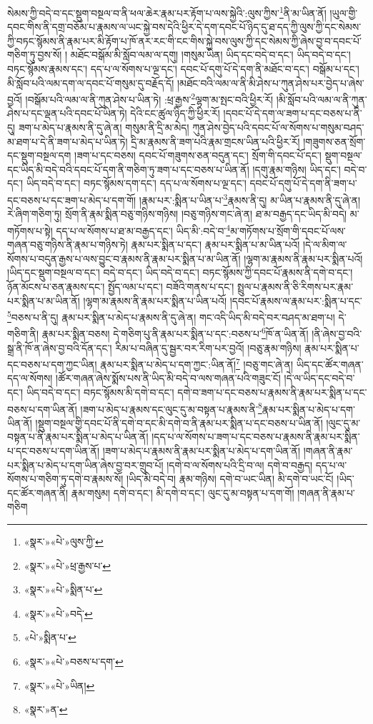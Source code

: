 སེམས་ཀྱི་བདེ་བ་དང་སྡུག་བསྔལ་བ་ནི་ཕལ་ཆེར་རྣམ་པར་རྟོག་པ་ལས་སྐྱེའི་:ལུས་ཀྱིས་\footnote{«སྣར་»«པེ་»ལུས་ཀྱི་}ནི་མ་ཡིན་ནོ། །ཡུལ་གྱི་དབང་གིས་ནི་དགྲ་བཅོམ་པ་རྣམས་ལ་ཡང་སྐྱེ་བས་དེའི་ཕྱིར་དེ་དག་དབང་པོ་ཉིད་དུ་ཐ་དད་ཀྱི་ལུས་ཀྱི་དང་སེམས་ཀྱི་བཏང་སྙོམས་ནི་རྣམ་པར་མི་རྟོག་པ་ཁོ་ནར་རང་གི་ངང་གིས་སྐྱེ་བས་ལུས་ཀྱི་དང་སེམས་ཀྱི་ཞེས་བྱ་བ་དབང་པོ་གཅིག་ཏུ་བྱས་སོ། །
མཐོང་བསྒོམ་མི་སློབ་ལམ་ལ་དགུ། །གསུམ་ཡིན། ཡིད་དང་བདེ་བ་དང་། ཡིད་བདེ་བ་དང་། བཏང་སྙོམས་རྣམས་དང་། དད་པ་ལ་སོགས་པ་ལྔ་དང་། དབང་པོ་དགུ་པོ་དེ་དག་ནི་མཐོང་བ་དང་། བསྒོམ་པ་དང་། མི་སློབ་པའི་ལམ་དག་ལ་དབང་པོ་གསུམ་དུ་བརྗོད་དོ། །མཐོང་བའི་ལམ་ལ་ནི་མི་ཤེས་པ་ཀུན་ཤེས་པར་བྱེད་པ་ཞེས་བྱའོ། །བསྒོམ་པའི་ལམ་ལ་ནི་ཀུན་ཤེས་པ་ཡིན་ཏེ། :ཕྲ་རྒྱས་\footnote{«སྣར་»«པེ་»ཕྲ་རྒྱས་པ་}ལྷག་མ་སྤང་བའི་ཕྱིར་རོ། །མི་སློབ་པའི་ལམ་ལ་ནི་ཀུན་ཤེས་པ་དང་ལྡན་པའི་དབང་པོ་ཡིན་ཏེ། དེའི་ངང་ཚུལ་ཉིད་ཀྱི་ཕྱིར་རོ། །དབང་པོ་དེ་དག་ལ་ཟག་པ་དང་བཅས་པ་ནི་དུ། ཟག་པ་མེད་པ་རྣམས་ནི་དུ་ཞེ་ན། གསུམ་ནི་དྲི་མ་མེད། ཀུན་ཤེས་བྱེད་པའི་དབང་པོ་ལ་སོགས་པ་གསུམ་བཤད་མ་ཐག་པ་དེ་ནི་ཟག་པ་མེད་པ་ཡིན་ཏེ། དྲི་མ་རྣམས་ནི་ཟག་པའི་རྣམ་གྲངས་ཡིན་པའི་ཕྱིར་རོ། །གཟུགས་ཅན་སྲོག་དང་སྡུག་བསྔལ་དག །ཟག་པ་དང་བཅས། དབང་པོ་གཟུགས་ཅན་བདུན་དང་། སྲོག་གི་དབང་པོ་དང་། སྡུག་བསྔལ་དང་ཡིད་མི་བདེ་བའི་དབང་པོ་དག་ནི་གཅིག་ཏུ་ཟག་པ་དང་བཅས་པ་ཡིན་ནོ། །དགུ་རྣམ་གཉིས། ཡིད་དང་། བདེ་བ་དང་། ཡིད་བདེ་བ་དང་། བཏང་སྙོམས་དག་དང་། དད་པ་ལ་སོགས་པ་ལྔ་དང་། དབང་པོ་དགུ་པོ་དེ་དག་ནི་ཟག་པ་དང་བཅས་པ་དང་ཟག་པ་མེད་པ་དག་གོ། །རྣམ་པར་:སྨིན་པ་ཡིན་པ་\footnote{«སྣར་»«པེ་»སྨིན་པ་}རྣམས་ནི་དུ། མ་ཡིན་པ་རྣམས་ནི་དུ་ཞེ་ན། རེ་ཞིག་གཅིག་ཏུ། སྲོག་ནི་རྣམ་སྨིན་བཅུ་གཉིས་གཉིས། །བཅུ་གཉིས་གང་ཞེ་ན། ཐ་མ་བརྒྱད་དང་ཡིད་མི་བདེ། མ་གཏོགས་པ་སྟེ། དད་པ་ལ་སོགས་པ་ཐ་མ་བརྒྱད་དང་། ཡིད་མི་:བདེ་བ་\footnote{«སྣར་»«པེ་»བདེ་}མ་གཏོགས་པ་སྲོག་གི་དབང་པོ་ལས་གཞན་བཅུ་གཉིས་ནི་རྣམ་པ་གཉིས་ཏེ། རྣམ་པར་སྨིན་པ་དང་། རྣམ་པར་སྨིན་པ་མ་ཡིན་པའོ། །དེ་ལ་མིག་ལ་སོགས་པ་བདུན་རྒྱས་པ་ལས་བྱུང་བ་རྣམས་ནི་རྣམ་པར་སྨིན་པ་མ་ཡིན་ནོ། །ལྷག་མ་རྣམས་ནི་རྣམ་པར་སྨིན་པའོ། །ཡིད་དང་སྡུག་བསྔལ་བ་དང་། བདེ་བ་དང་། ཡིད་བདེ་བ་དང་། བཏང་སྙོམས་ཀྱི་དབང་པོ་རྣམས་ནི་དགེ་བ་དང་། ཉོན་མོངས་པ་ཅན་རྣམས་དང་། སྤྱོད་ལམ་པ་དང་། བཟོའི་གནས་པ་དང་། སྤྲུལ་པ་རྣམས་ནི་ཅི་རིགས་པར་རྣམ་པར་སྨིན་པ་མ་ཡིན་ནོ། །ལྷག་མ་རྣམས་ནི་རྣམ་པར་སྨིན་པ་ཡིན་པའོ། །དབང་པོ་རྣམས་ལ་རྣམ་པར་:སྨིན་པ་དང་\footnote{«པེ་»སྨིན་པ་}བཅས་པ་ནི་དུ། རྣམ་པར་སྨིན་པ་མེད་པ་རྣམས་ནི་དུ་ཞེ་ན། གང་འདི་ཡིད་མི་བདེ་བར་བཤད་མ་ཐག་པ། དེ་གཅིག་ནི། རྣམ་པར་སྨིན་བཅས། དེ་གཅིག་པུ་ནི་རྣམ་པར་སྨིན་པ་དང་:བཅས་པ་\footnote{«སྣར་»«པེ་»བཅས་པ་དག་}ཁོ་ན་ཡིན་ནོ། །ནི་ཞེས་བྱ་བའི་སྒྲ་ནི་ཁོ་ན་ཞེས་བྱ་བའི་དོན་དང་། རིམ་པ་བཞིན་དུ་སྦྱར་བར་རིག་པར་བྱའོ། །བཅུ་རྣམ་གཉིས། རྣམ་པར་སྨིན་པ་དང་བཅས་པ་དག་ཀྱང་ཡིན། རྣམ་པར་སྨིན་པ་མེད་པ་དག་ཀྱང་:ཡིན་ནོ།\footnote{«སྣར་»«པེ་»ཡིན།} །བཅུ་གང་ཞེ་ན། ཡིད་དང་ཚོར་གཞན་དད་ལ་སོགས། །ཚོར་གཞན་ཞེས་སྨོས་པས་ནི་ཡིད་མི་བདེ་བ་ལས་གཞན་པའི་གཟུང་ངོ། །དེ་ལ་ཡིད་དང་བདེ་བ་དང་། ཡིད་བདེ་བ་དང་། བཏང་སྙོམས་མི་དགེ་བ་དང་། དགེ་བ་ཟག་པ་དང་བཅས་པ་རྣམས་ནི་རྣམ་པར་སྨིན་པ་དང་བཅས་པ་དག་ཡིན་ནོ། །ཟག་པ་མེད་པ་རྣམས་དང་ལུང་དུ་མ་བསྟན་པ་རྣམས་ནི་\footnote{«སྣར་»ན་}རྣམ་པར་སྨིན་པ་མེད་པ་དག་ཡིན་ནོ། །སྡུག་བསྔལ་གྱི་དབང་པོ་ནི་དགེ་བ་དང་མི་དགེ་བ་ནི་རྣམ་པར་སྨིན་པ་དང་བཅས་པ་ཡིན་ནོ། །ལུང་དུ་མ་བསྟན་པ་ནི་རྣམ་པར་སྨིན་པ་མེད་པ་ཡིན་ནོ། །དད་པ་ལ་སོགས་པ་ཟག་པ་དང་བཅས་པ་རྣམས་ནི་རྣམ་པར་སྨིན་པ་དང་བཅས་པ་དག་ཡིན་ནོ། །ཟག་པ་མེད་པ་རྣམས་ནི་རྣམ་པར་སྨིན་པ་མེད་པ་དག་ཡིན་ནོ། །གཞན་ནི་རྣམ་པར་སྨིན་པ་མེད་པ་དག་ཡིན་ཞེས་བྱ་བར་གྲུབ་པོ། །དགེ་བ་ལ་སོགས་པའི་དྲི་བ་ལ། དགེ་བ་བརྒྱད། དད་པ་ལ་སོགས་པ་གཅིག་ཏུ་དགེ་བ་རྣམས་སོ། །ཡིད་མི་བདེ་བ། རྣམ་གཉིས། དགེ་བ་ཡང་ཡིན། མི་དགེ་བ་ཡང་ངོ། །ཡིད་དང་ཚོར་གཞན་ནི། རྣམ་གསུམ། དགེ་བ་དང་། མི་དགེ་བ་དང་། ལུང་དུ་མ་བསྟན་པ་དག་གོ། །གཞན་ནི་རྣམ་པ་གཅིག 